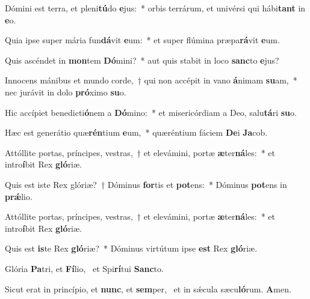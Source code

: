 \item Dómini est terra, et pleni\textbf{tú}do \textbf{e}jus:~* orbis terrárum, et univérsi qui hábi\textbf{tant} in \textbf{e}o.
\item Quia ipse super mária fun\textbf{dá}vit \textbf{e}um:~* et super flúmina præpa\textbf{rá}vit \textbf{e}um.
\item Quis ascéndet in \textbf{mon}tem \textbf{Dó}mini?~* aut quis stabit in loco \textbf{sanc}to \textbf{e}jus?
\item Innocens mánibus et mundo corde,~† qui non accépit in vano \textbf{á}nimam \textbf{su}am,~* nec jurávit in dolo \textbf{pró}ximo \textbf{su}o.
\item Hic accípiet benedicti\textbf{ó}nem a \textbf{Dó}mino:~* et misericórdiam a Deo, salu\textbf{tá}ri \textbf{su}o.
\item Hæc est generátio quæ\textbf{rén}tium \textbf{e}um,~* quæréntium fáciem \textbf{De}i \textbf{Ja}cob.
\item Attóllite portas, príncipes, vestras,~† et elevámini, portæ \textbf{æ}ter\textbf{ná}les:~* et intro\textbf{í}bit Rex \textbf{gló}riæ.
\item Quis est iste Rex glóriæ?~† Dóminus \textbf{for}tis et \textbf{pot}ens:~* Dóminus \textbf{pot}ens in \textbf{prǽ}lio.
\item Attóllite portas, príncipes, vestras,~† et elevámini, portæ \textbf{æ}ter\textbf{ná}les:~* et intro\textbf{í}bit Rex \textbf{gló}riæ.
\item Quis est \textbf{is}te Rex \textbf{gló}riæ?~* Dóminus virtútum ipse \textbf{est} Rex \textbf{gló}riæ.
\item Glória \textbf{Pa}tri, et \textbf{Fí}lio,~\psstar{} et Spi\textbf{rí}tui \textbf{Sanc}to.
\item Sicut erat in princípio, et \textbf{nunc}, et \textbf{sem}per,~\psstar{} et in sǽcula sæcu\textbf{ló}rum. \textbf{A}men.
